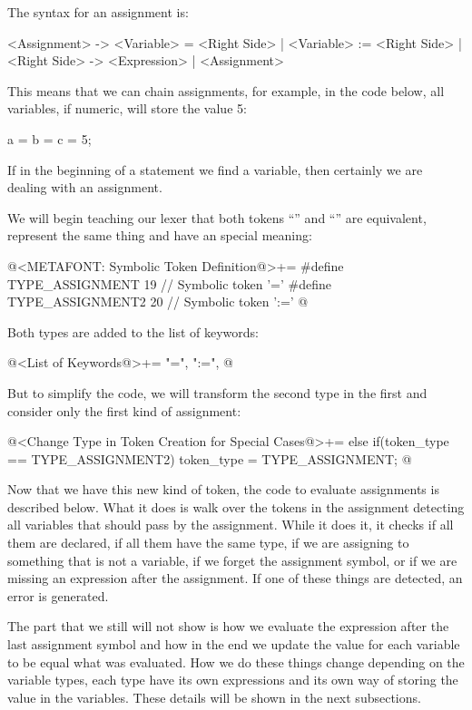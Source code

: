 The syntax for an assignment is:

\alinhaverbatim
<Assignment> -> <Variable> = <Right Side> |
                <Variable> := <Right Side> |
<Right Side> -> <Expression> | <Assignment>
\alinhanormal

This means that we can chain assignments, for example, in the code
below, all variables, if numeric, will store the value 5:

\alinhaverbatim
a = b = c = 5;
\alinhanormal

If in the beginning of a statement we find a variable, then certainly
we are dealing with an assignment.

We will begin teaching our lexer that both tokens ``\monoespaco{=}''
and ``\monoespaco{:=}'' are equivalent, represent the same thing and
have an special meaning:

\iniciocodigo
@<METAFONT: Symbolic Token Definition@>+=
#define TYPE_ASSIGNMENT            19 // Symbolic token '='
#define TYPE_ASSIGNMENT2           20 // Symbolic token ':='
@
\fimcodigo

Both types are added to the list of keywords:

\iniciocodigo
@<List of Keywords@>+=
"=", ":=",
@
\fimcodigo

But to simplify the code, we will transform the second type in the
first and consider only the first kind of assignment:

\iniciocodigo
@<Change Type in Token Creation for Special Cases@>+=
else if(token_type == TYPE_ASSIGNMENT2)
  token_type = TYPE_ASSIGNMENT;
@
\fimcodigo


Now that we have this new kind of token, the code to evaluate
assignments is described below. What it does is walk over the tokens
in the assignment detecting all variables that should pass by the
assignment. While it does it, it checks if all them are declared, if
all them have the same type, if we are assigning to something that is
not a variable, if we forget the assignment symbol, or if we are
missing an expression after the assignment. If one of these things are
detected, an error is generated.

The part that we still will not show is how we evaluate the expression
after the last assignment symbol and how in the end we update the
value for each variable to be equal what was evaluated. How we do
these things change depending on the variable types, each type have
its own expressions and its own way of storing the value in the
variables. These details will be shown in the next subsections.

